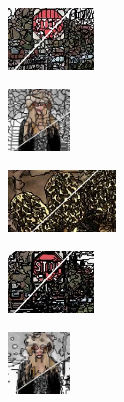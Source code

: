 \begin{figure}
\begin{subfigure}[b]{0.129\textwidth}
		\includegraphics[height=1.65cm]{pictures/sbd/nc/cropped/nc_6000067_contours}
	\end{subfigure}
	\begin{subfigure}[b]{0.10\textwidth}
		\includegraphics[height=1.65cm]{pictures/fash/nc/cropped/nc_132_contours}
	\end{subfigure}
	\begin{subfigure}[b]{0.02\textwidth}
	\end{subfigure}
	\begin{subfigure}[b]{0.16\textwidth}
		\includegraphics[height=1.65cm]{pictures/bsds500/fh/cropped/fh_208078_contours}
	\end{subfigure}
	\begin{subfigure}[b]{0.129\textwidth}
		\includegraphics[height=1.65cm]{pictures/sbd/fh/cropped/fh_6000067_contours}
	\end{subfigure}
	\begin{subfigure}[b]{0.10\textwidth}
		\includegraphics[height=1.65cm]{pictures/fash/fh/cropped/fh_132_contours}
	\end{subfigure}\\
	\begin{subfigure}[b]{0.02\textwidth}
	\end{subfigure}

\end{figure}
